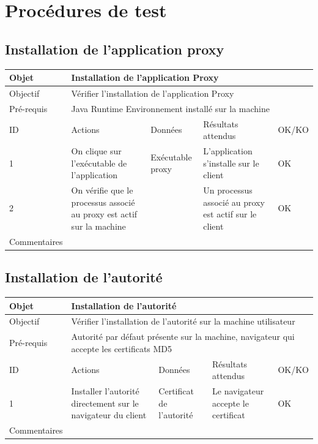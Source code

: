 \documentclass[a4paper,11pt,french]{article}
\begin{document}
\section{Procédures de test}
\subsection{Installation de l'application proxy}

\begin{tabular}{|m{2.5cm}|m{4cm}|m{3cm}|m{3.5cm}|m{2cm}|}
\hline 
\rowcolor{Blue} Objet & \multicolumn{4}{|l|}{Installation de l'application Proxy} \\ 
\hline 
\rowcolor{Blue} Objectif & \multicolumn{4}{|l|}{Vérifier l'installation de l'application Proxy} \\ 
\hline 
\rowcolor{Blue} Pré-requis & \multicolumn{4}{|l|}{Java Runtime Environnement installé sur la machine} \\ 
\hline 
\rowcolor{Orange} ID & Actions & Données & Résultats attendus & OK/KO \\ 
\hline 
1 & On clique sur l'exécutable de l'application & Exécutable proxy & L'application s'installe sur le client & OK \\ 
\hline
2 & On vérifie que le processus associé au proxy est actif sur la machine & & Un processus associé au proxy est actif sur le client & OK\\
\hline
Commentaires & \multicolumn{4}{|l|}{} \\ 
\hline
\end{tabular}

\newpage

\subsection{Installation de l'autorité}

\begin{tabular}{|m{2.5cm}|m{4cm}|m{3cm}|m{3.5cm}|m{2cm}|}
\hline 
\rowcolor{Blue} Objet & \multicolumn{4}{|l|}{Installation de l'autorité} \\ 
\hline 
\rowcolor{Blue} Objectif & \multicolumn{4}{|l|}{Vérifier l'installation de l'autorité sur la machine utilisateur} \\ 
\hline 
\rowcolor{Blue} Pré-requis & \multicolumn{4}{|l|}{Autorité par défaut présente sur la machine, navigateur qui accepte les certificats MD5} \\ 
\hline 
\rowcolor{Orange} ID & Actions & Données & Résultats attendus & OK/KO \\ 
\hline 
1 & Installer l'autorité directement sur le navigateur du client & Certificat de l'autorité & Le navigateur accepte le certificat &  OK\\ 
\hline 
Commentaires & \multicolumn{4}{|l|}{} \\ 
\hline
\end{tabular}
\end{document}
